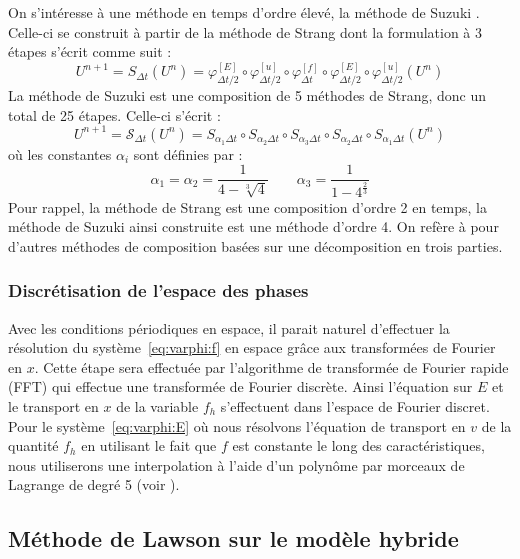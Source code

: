 On s'intéresse à une méthode en temps d'ordre élevé, la méthode de Suzuki \cite{Suzuki:1990}. Celle-ci se construit à partir de la méthode de Strang \cite{Strang:1968} dont la formulation à 3 étapes s'écrit comme suit :
\begin{equation}
  U^{n+1} = S_{\Delta t}(U^n) = \varphi^{[E]}_{\Delta t/2} \circ \varphi^{[u]}_{\Delta t/2} \circ \varphi^{[f]}_{\Delta t} \circ \varphi^{[E]}_{\Delta t/2} \circ \varphi^{[u]}_{\Delta t/2} (U^n) 
  \label{eq:strang}
\end{equation}
La méthode de Suzuki est une composition de 5 méthodes de Strang, donc un total de 25 étapes. Celle-ci s'écrit :
\begin{equation}
  U^{n+1} = \mathcal{S}_{\Delta t}(U^n) = S_{\alpha_1\Delta t} \circ S_{\alpha_2\Delta t} \circ S_{\alpha_3\Delta t} \circ S_{\alpha_2\Delta t} \circ S_{\alpha_1\Delta t} (U^n)
  \label{eq:suzuki}
\end{equation}
où les constantes $\alpha_i$ sont définies par :
$$
  \alpha_1 = \alpha_2 = \frac{1}{4 - \sqrt[3]{4}} \qquad \alpha_3 = \frac{1}{1- 4^{\frac{2}{3}}}
$$
Pour rappel, la méthode de Strang est une composition d'ordre 2 en temps, la méthode de Suzuki ainsi construite est une méthode d'ordre 4. 
On refère à \cite{Casas:2020} pour d'autres méthodes de composition basées sur une décomposition en trois parties. 

\subsubsection{Discrétisation de l'espace des phases}

Avec les conditions périodiques en espace, il parait naturel d'effectuer la résolution du système~\eqref{eq:varphi:f} en espace grâce aux transformées de Fourier en $x$. Cette étape sera effectuée par l'algorithme de transformée de Fourier rapide (FFT) qui effectue une transformée de Fourier discrète. Ainsi l'équation sur $E$ et le transport en $x$ de la variable $f_h$ s'effectuent dans l'espace de Fourier discret. Pour le système~\eqref{eq:varphi:E} où nous résolvons l'équation de transport en $v$ de la quantité $f_h$ en utilisant le fait que $f$ est constante le long des  caractéristiques, nous utiliserons une interpolation à l'aide d'un polynôme par morceaux de Lagrange de degré 5 (voir \cite{Charles:2013}). 



\subsection{Méthode de Lawson sur le modèle hybride}\label{ssec:lawson}

